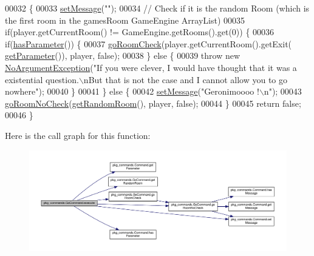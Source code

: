 \begin{DoxyCode}
00032                                                                                                            
                              \{
00033         \hyperlink{classpkg__commands_1_1Command_ae210ff216fe908b111ba1c988a963d13}{setMessage}(\textcolor{stringliteral}{""});
00034         \textcolor{comment}{// Check if it is the random Room (which is the first room in the gamesRoom GameEngine ArrayList)}
00035         \textcolor{keywordflow}{if}(player.getCurrentRoom() != GameEngine.getRooms().\textcolor{keyword}{get}(0)) \{
00036             \textcolor{keywordflow}{if}(\hyperlink{classpkg__commands_1_1Command_a02af95ab3f1898a66259ab7c177b6998}{hasParameter}()) \{
00037                 \hyperlink{classpkg__commands_1_1GoCommand_acbf1aa81fa5b1aef7cafb8b4e3ace3a9}{goRoomCheck}(player.getCurrentRoom().getExit(
      \hyperlink{classpkg__commands_1_1Command_a41c92d445be73ea9d62320c65efb8434}{getParameter}()), player, \textcolor{keyword}{false});
00038             \} \textcolor{keywordflow}{else} \{
00039                 \textcolor{keywordflow}{throw} \textcolor{keyword}{new} \hyperlink{classpkg__exceptions_1_1NoArgumentException}{NoArgumentException}(\textcolor{stringliteral}{"If you were clever, I would have thought
       that it was a existential question.\(\backslash\)nBut that is not the case and I cannot allow you to go nowhere"});
00040             \}
00041         \} \textcolor{keywordflow}{else} \{
00042             \hyperlink{classpkg__commands_1_1Command_ae210ff216fe908b111ba1c988a963d13}{setMessage}(\textcolor{stringliteral}{"Geronimoooo !\(\backslash\)n"});
00043             \hyperlink{classpkg__commands_1_1GoCommand_a210afbc5f3ef34d3ad5759d853c8f8c2}{goRoomNoCheck}(\hyperlink{classpkg__commands_1_1GoCommand_ae9ef6c18b0cbd0e0104261bdedf9a9d7}{getRandomRoom}(), player, \textcolor{keyword}{false});
00044         \}
00045         \textcolor{keywordflow}{return} \textcolor{keyword}{false};
00046     \}
\end{DoxyCode}


Here is the call graph for this function\-:
\nopagebreak
\begin{figure}[H]
\begin{center}
\leavevmode
\includegraphics[width=350pt]{classpkg__commands_1_1GoCommand_a82e9a64a0fac612f788060a90c83f9b1_cgraph}
\end{center}
\end{figure}


